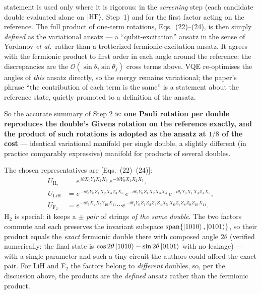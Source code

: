 \documentclass[11pt]{article}
\begin{document}
\begin{itemize}
  statement is used only where it is rigorous: in the \emph{screening} step
  (each candidate double evaluated alone on $\ket{\rm HF}$, Step~1) and for
  the first factor acting on the reference. The full product of one-term
  rotations, Eqs.~(22)--(24), is then simply \emph{defined} as the
  variational ansatz --- a ``qubit-excitation'' ansatz in the sense of
  Yordanov \emph{et al.}\ rather than a trotterized fermionic-excitation
  ansatz. It agrees with the fermionic product to first order in each angle
  around the reference; the discrepancies are the
  $\mathcal{O}(\sin\theta_i\sin\theta_j)$ cross terms above. VQE
  re-optimises the angles of \emph{this} ansatz directly, so the energy
  remains variational; the paper's phrase ``the contribution of each term is
  the same'' is a statement about the reference state, quietly promoted to a
  definition of the ansatz.
\end{itemize}
So the accurate summary of Step 2 is: \textbf{one Pauli rotation per double
reproduces the double's Givens rotation on the reference exactly, and the
product of such rotations is adopted as the ansatz at $1/8$ of the cost} ---
identical variational manifold per single double, a slightly different (in
practice comparably expressive) manifold for products of several doubles.

The chosen representatives are [Eqs.~(22)--(24)]:
\begin{align}
U_{\mathrm{H}_2}  &= e^{\,i\theta X_0Y_1X_2X_3}\, e^{-i\theta Y_0X_1X_2X_3},\\
U_{\mathrm{LiH}}  &= e^{-i\theta_3 Y_0Z_1X_2X_3Z_4X_5}\,
                     e^{-i\theta_2 Y_0Z_1X_2X_3X_4}\,
                     e^{-i\theta_1 Y_0X_1X_3Z_4X_5},\\
U_{\mathrm{F}_2}  &= e^{-i\theta_5 X_4X_5Y_{10}X_{11}}\cdots
                     e^{-i\theta_1 Y_0Z_1Z_2Z_3Z_4X_5\,X_6Z_7Z_8Z_9Z_{10}X_{11}} .
\end{align}
H$_2$ is special: it keeps a $\pm$ \emph{pair} of strings \emph{of the same
double}. The two factors commute and each preserves the invariant subspace
$\mathrm{span}\{\ket{1010},\ket{0101}\}$, so their product equals the
\emph{exact} fermionic double there with composed angle $2\theta$ (verified
numerically: the final state is
$\cos2\theta\ket{1010}-\sin2\theta\ket{0101}$ with no leakage) --- with a
single parameter and such a tiny circuit the authors could afford the exact
pair. For LiH and F$_2$ the factors belong to \emph{different} doubles, so,
per the discussion above, the products are the \emph{defined} ansatz rather
than the fermionic product.
\end{document}
